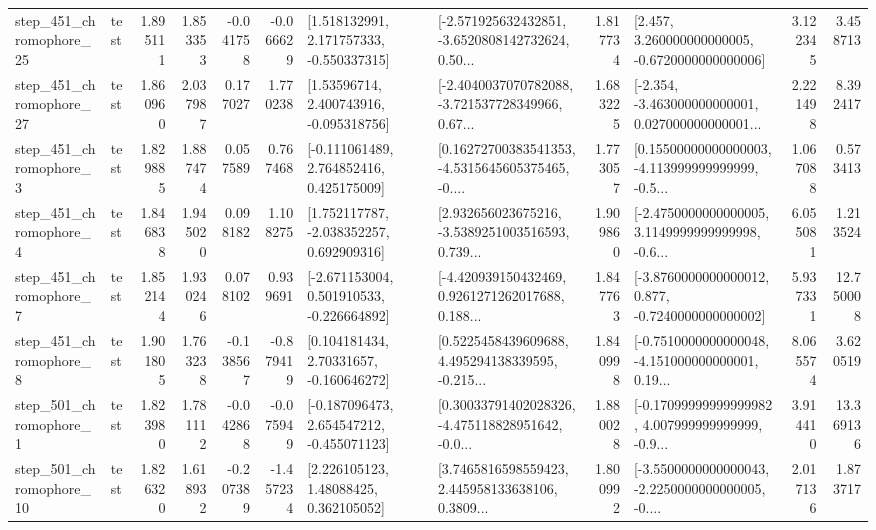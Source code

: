 \begin{tabular}{llrrrrllrlrr}
  step\_451\_chromophore\_25 &      test &      1.895111 &    1.853353 &     -0.041758 & -0.066629 &    [1.518132991, 2.171757333, -0.550337315] &  [-2.571925632432851, -3.6520808142732624, 0.50... &       1.817734 &    [2.457, 3.260000000000005, -0.6720000000000006] &            3.122345 &          3.458713 \\
  step\_451\_chromophore\_27 &      test &      1.860960 &    2.037987 &      0.177027 &  1.770238 &     [1.53596714, 2.400743916, -0.095318756] &  [-2.4040037070782088, -3.721537728349966, 0.67... &       1.683225 &  [-2.354, -3.463000000000001, 0.027000000000001... &            2.221498 &          8.392417 \\
   step\_451\_chromophore\_3 &      test &      1.829885 &    1.887474 &      0.057589 &  0.767468 &    [-0.111061489, 2.764852416, 0.425175009] &  [0.16272700383541353, -4.5315645605375465, -0.... &       1.773057 &  [0.15500000000000003, -4.113999999999999, -0.5... &            1.067088 &          0.573413 \\
   step\_451\_chromophore\_4 &      test &      1.846838 &    1.945020 &      0.098182 &  1.108275 &    [1.752117787, -2.038352257, 0.692909316] &  [2.932656023675216, -3.5389251003516593, 0.739... &       1.909860 &  [-2.4750000000000005, 3.1149999999999998, -0.6... &            6.055081 &          1.213524 \\
   step\_451\_chromophore\_7 &      test &      1.852144 &    1.930246 &      0.078102 &  0.939691 &   [-2.671153004, 0.501910533, -0.226664892] &  [-4.420939150432469, 0.9261271262017688, 0.188... &       1.847763 &  [-3.8760000000000012, 0.877, -0.7240000000000002] &            5.937331 &         12.750008 \\
   step\_451\_chromophore\_8 &      test &      1.901805 &    1.763238 &     -0.138567 & -0.879419 &     [0.104181434, 2.70331657, -0.160646272] &  [0.5225458439609688, 4.495294138339595, -0.215... &       1.840998 &  [-0.7510000000000048, -4.151000000000001, 0.19... &            8.065574 &          3.620519 \\
   step\_501\_chromophore\_1 &      test &      1.823980 &    1.781112 &     -0.042868 & -0.075949 &   [-0.187096473, 2.654547212, -0.455071123] &  [0.30033791402028326, -4.475118828951642, -0.0... &       1.880028 &  [-0.17099999999999982, 4.007999999999999, -0.9... &            3.914410 &         13.369136 \\
  step\_501\_chromophore\_10 &      test &      1.826320 &    1.618932 &     -0.207389 & -1.457234 &      [2.226105123, 1.48088425, 0.362105052] &  [3.7465816598559423, 2.445958133638106, 0.3809... &       1.800992 &  [-3.5500000000000043, -2.2250000000000005, -0.... &            2.017136 &          1.873717 \\

\end{tabular}
